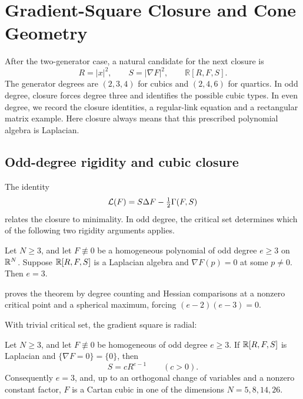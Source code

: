 \section[Gradient-Square Closure]{Gradient-Square Closure and Cone Geometry}
\label{sec:gradient-square-closure}

After the two-generator case, a natural candidate for the next closure
is
\[
 R=|x|^2,\qquad S=|\nabla F|^2,\qquad
 \mathbb R[R,F,S].
\]
The generator degrees are \((2,3,4)\) for cubics and \((2,4,6)\)
for quartics. In odd degree, closure forces degree three and identifies
the possible cubic types. In even degree, we record the closure
identities, a regular-link equation and a rectangular matrix example.
Here closure always means that this prescribed
polynomial algebra is Laplacian.

\subsection{Odd-degree rigidity and cubic closure}
\label{sec:gradient-square-rigidity}

The identity
\[
 \mathcal L(F)=S\Delta F-\tfrac12\Gamma(F,S)
\]
relates the closure to minimality. In odd degree, the critical set
determines which of the following two rigidity arguments applies.

\begin{theorem}\label{thm:odd}
Let \(N\geq3\), and let \(F\not\equiv0\) be a homogeneous polynomial of
odd degree \(e\geq3\) on \(\mathbb R^N\). Suppose \(\mathbb R[R,F,S]\) is a
Laplacian algebra and \(\nabla F(p)=0\) at some \(p\ne0\).
Then \(e=3\).
\end{theorem}

 proves the theorem by degree counting
and Hessian comparisons at a nonzero critical point and a spherical
maximum, forcing $(e-2)(e-3)=0$.

With trivial critical set, the gradient square is radial:

\begin{theorem}
\label{thm:odd-isolated-closure}
Let \(N\geq3\), and let \(F\not\equiv0\) be homogeneous of odd degree
\(e\geq3\). If \(\mathbb R[R,F,S]\) is Laplacian and
\(\{\nabla F=0\}=\{0\}\), then
\[
 S=cR^{e-1}\qquad(c>0).
\]
Consequently \(e=3\), and, up to an orthogonal change of variables
and a nonzero constant factor, \(F\) is a Cartan cubic in one of the
dimensions \(N=5,8,14,26\).
\end{theorem}

